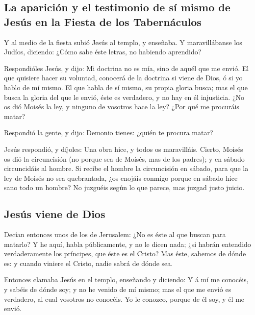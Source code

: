 \hypertarget{la-apariciuxf3n-y-el-testimonio-de-suxed-mismo-de-jesuxfas-en-la-fiesta-de-los-tabernuxe1culos}{%
\subsection{La aparición y el testimonio de sí mismo de Jesús en la
Fiesta de los
Tabernáculos}\label{la-apariciuxf3n-y-el-testimonio-de-suxed-mismo-de-jesuxfas-en-la-fiesta-de-los-tabernuxe1culos}}

 Y al medio de la fiesta subió Jesús al templo, y enseñaba.
 Y maravillábanse los Judíos, diciendo: ¿Cómo sabe éste
letras, no habiendo aprendido?

 Respondióles Jesús, y dijo: Mi doctrina no es mía, sino de
aquél que me envió.  El que quisiere hacer su voluntad,
conocerá de la doctrina si viene de Dios, ó si yo hablo de mí mismo.
 El que habla de sí mismo, su propia gloria busca; mas el
que busca la gloria del que le envió, éste es verdadero, y no hay en él
injusticia.  ¿No os dió Moisés la ley, y ninguno de
vosotros hace la ley? ¿Por qué me procuráis matar?

 Respondió la gente, y dijo: Demonio tienes: ¿quién te
procura matar?

 Jesús respondió, y díjoles: Una obra hice, y todos os
maravilláis.  Cierto, Moisés os dió la circuncisión (no
porque sea de Moisés, mas de los padres); y en sábado circuncidáis al
hombre.  Si recibe el hombre la circuncisión en sábado,
para que la ley de Moisés no sea quebrantada, ¿os enojáis conmigo porque
en sábado hice sano todo un hombre?  No juzguéis según lo
que parece, mas juzgad justo juicio.

\hypertarget{jesuxfas-viene-de-dios}{%
\subsection{Jesús viene de Dios}\label{jesuxfas-viene-de-dios}}

 Decían entonces unos de los de Jerusalem: ¿No es éste al
que buscan para matarlo?  Y he aquí, habla públicamente, y
no le dicen nada; ¿si habrán entendido verdaderamente los príncipes, que
éste es el Cristo?  Mas éste, sabemos de dónde es: y cuando
viniere el Cristo, nadie sabrá de dónde sea.

 Entonces clamaba Jesús en el templo, enseñando y diciendo:
Y á mí me conocéis, y sabéis de dónde soy; y no he venido de mí mismo;
mas el que me envió es verdadero, al cual vosotros no conocéis.
 Yo le conozco, porque de él soy, y él me envió.

